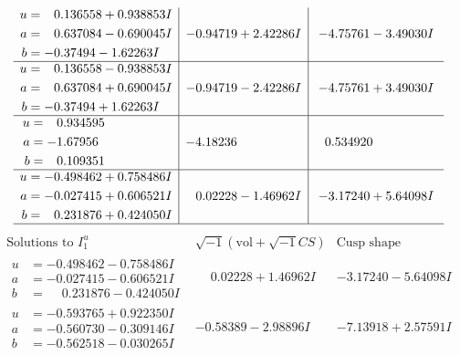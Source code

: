 \documentclass[1p]{elsarticle_modified}
\theoremstyle{definition}
\newcommand{\I}{\sqrt{-1}}
\begin{document}
$$\begin{array}{c|c|c}
\begin{aligned}
u &= \phantom{-}0.136558 + 0.938853 I \\
a &= \phantom{-}0.637084 - 0.690045 I \\
b &= -0.37494 - 1.62263 I\end{aligned}
 & -0.94719 + 2.42286 I & -4.75761 - 3.49030 I \\ \hline\begin{aligned}
u &= \phantom{-}0.136558 - 0.938853 I \\
a &= \phantom{-}0.637084 + 0.690045 I \\
b &= -0.37494 + 1.62263 I\end{aligned}
 & -0.94719 - 2.42286 I & -4.75761 + 3.49030 I \\ \hline\begin{aligned}
u &= \phantom{-}0.934595\phantom{ +0.000000I} \\
a &= -1.67956\phantom{ +0.000000I} \\
b &= \phantom{-}0.109351\phantom{ +0.000000I}\end{aligned}
 & -4.18236\phantom{ +0.000000I} & \phantom{-}0.534920\phantom{ +0.000000I} \\ \hline\begin{aligned}
u &= -0.498462 + 0.758486 I \\
a &= -0.027415 + 0.606521 I \\
b &= \phantom{-}0.231876 + 0.424050 I\end{aligned}
 & \phantom{-}0.02228 - 1.46962 I & -3.17240 + 5.64098 I\\
 \hline 
 \end{array}$$\newpage$$\begin{array}{c|c|c}  
\text{Solutions to }I^u_{1}& \I (\text{vol} + \sqrt{-1}CS) & \text{Cusp shape}\\
 \hline 
\begin{aligned}
u &= -0.498462 - 0.758486 I \\
a &= -0.027415 - 0.606521 I \\
b &= \phantom{-}0.231876 - 0.424050 I\end{aligned}
 & \phantom{-}0.02228 + 1.46962 I & -3.17240 - 5.64098 I \\ \hline\begin{aligned}
u &= -0.593765 + 0.922350 I \\
a &= -0.560730 - 0.309146 I \\
b &= -0.562518 - 0.030265 I\end{aligned}
 & -0.58389 - 2.98896 I & -7.13918 + 2.57591 I \\ \hline\begin{aligned}

\end{aligned}
\end{array}$$
\end{document}
